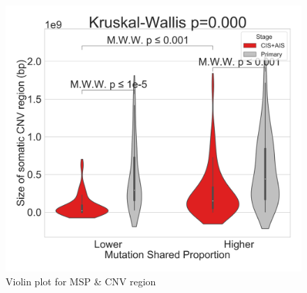 \documentclass{beamer}
\begin{document}
\begin{frame}[allowframebreaks]
                    \begin{figure}
                        \includegraphics[width=0.4 \linewidth]{figures/MutationSharedProportion_CNV/Region/Region.BWA.Sequenza.SQC.median/Violin_Mutation Shared Proportion.pdf}
                        \caption{Violin plot for MSP \& CNV region}
                    \end{figure}
                \end{frame}
\end{document}
